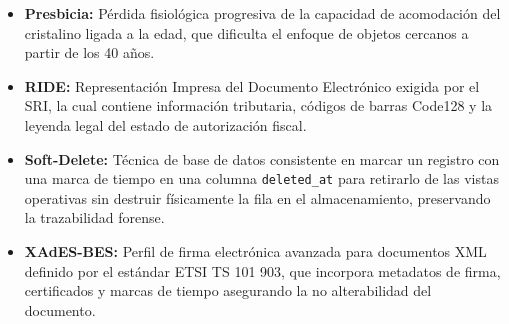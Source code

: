 \documentclass[12pt,a4paper]{report}
\begin{document}
\begin{itemize}
    \item \textbf{Presbicia:} Pérdida fisiológica progresiva de la capacidad de acomodación del cristalino ligada a la edad, que dificulta el enfoque de objetos cercanos a partir de los 40 años.
    \item \textbf{RIDE:} Representación Impresa del Documento Electrónico exigida por el SRI, la cual contiene información tributaria, códigos de barras Code128 y la leyenda legal del estado de autorización fiscal.
    \item \textbf{Soft-Delete:} Técnica de base de datos consistente en marcar un registro con una marca de tiempo en una columna \texttt{deleted\_at} para retirarlo de las vistas operativas sin destruir físicamente la fila en el almacenamiento, preservando la trazabilidad forense.
    \item \textbf{XAdES-BES:} Perfil de firma electrónica avanzada para documentos XML definido por el estándar ETSI TS 101 903, que incorpora metadatos de firma, certificados y marcas de tiempo asegurando la no alterabilidad del documento.
\end{itemize}
\end{document}
